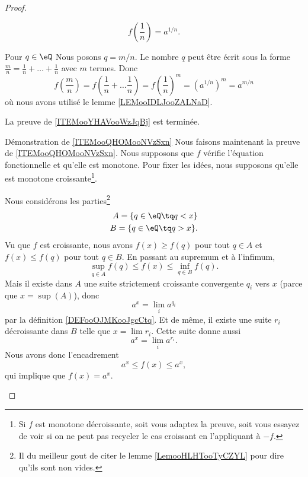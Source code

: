 \begin{proof}
\begin{subproof}
\begin{equation}
                f(\frac{1}{ n })=a^{1/n}.
            \end{equation}
        \item[Pour \( q\in \eQ\)]
            Nous posons \( q=m/n\). Le nombre \( q\) peut être écrit sous la forme \( \frac{ m }{ n }=\frac{1}{ n }+\ldots +\frac{1}{ n }\) avec \( m\) termes. Donc
            \begin{equation}
                f(\frac{ m }{ n })=f(\frac{1}{ n }+\ldots \frac{1}{ n })=f(\frac{1}{ n })^{m}=(a^{1/n})^m=a^{m/n}
            \end{equation}
            où nous avons utilisé le lemme \ref{LEMooIDLJooZALNaD}.
    \end{subproof}
    La preuve de \ref{ITEMooYHAVooWzJqBj} est terminée.

    \begin{subproof}
        \item[Démonstration de \ref{ITEMooQHOMooNVzSxn}]
            Nous faisons maintenant la preuve de \ref{ITEMooQHOMooNVzSxn}. Nous supposons que \( f\) vérifie l'équation fonctionnelle et qu'elle est monotone. Pour fixer les idées, nous supposons qu'elle est monotone croissante\footnote{Si \( f\) est monotone décroissante, soit vous adaptez la preuve, soit vous essayez de voir si on ne peut pas recycler le cas croissant en l'appliquant à \( -f\).}.
        
            Nous considérons les parties\footnote{Il du meilleur gout de citer le lemme \ref{LemooHLHTooTyCZYL} pour dire qu'ils sont non vides.}
            \begin{subequations}
                \begin{align}
                    A=\{ q\in \eQ\tq q<x \}\\
                    B=\{ q\in \eQ\tq q>x \}.
                \end{align}
            \end{subequations}
            Vu que \( f\) est croissante, nous avons \( f(x)\geq f(q)\) pour tout \( q\in A\) et \( f(x)\leq f(q)\) pour tout \( q\in B\). En passant au supremum et à l'infimum,
            \begin{equation}
                \sup_{q\in A}f(q)\leq f(x)\leq \inf_{q\in B}f(q).
            \end{equation}
            Mais il existe dans \( A\) une suite strictement croissante convergente \( q_i\) vers \( x\) (parce que \( x=\sup(A)\)), donc
            \begin{equation}
                a^x=\lim_ia^{q_i}
            \end{equation}
            par la définition \ref{DEFooOJMKooJgcCtq}. Et de même, il existe une suite \( r_i\) décroissante dans \( B\) telle que \( x=\lim r_i\). Cette suite donne aussi
            \begin{equation}
                a^x=\lim_i a^{r_i}.
            \end{equation}
            Nous avons donc l'encadrement
            \begin{equation}
                a^x\leq f(x)\leq a^x,
            \end{equation}
            qui implique que \( f(x)=a^x\).


\end{subproof}
\end{proof}
